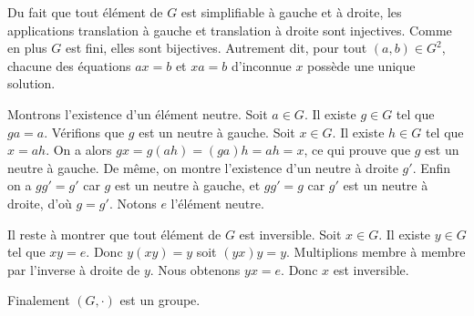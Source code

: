 Du fait que tout élément de $G$ est simplifiable à gauche et à droite, les
applications translation à gauche et translation à droite sont injectives.
Comme en plus $G$ est fini, elles sont bijectives. Autrement dit, pour tout
$(a,b)\in G^2$, chacune des équations $ax = b$ et $xa = b$ d'inconnue $x$
possède une unique solution.

Montrons l'existence d'un élément neutre. Soit $a\in G$. Il existe $g\in G$ tel
que $ga = a$. Vérifions que $g$ est un neutre à gauche. Soit $x\in G$. Il
existe $h\in G$ tel que $x = ah$. On a alors $gx = g(ah) = (ga)h = ah = x$, ce
qui prouve que $g$ est un neutre à gauche. De même, on montre l'existence
d'un neutre à droite $g'$. Enfin on a $gg' = g'$ car $g$ est un neutre à
gauche, et $gg' = g$ car $g'$ est un neutre à droite, d'où $g = g'$. Notons $e$
l'élément neutre.

Il reste à montrer que tout élément de $G$ est inversible. Soit $x\in G$. Il
existe $y\in G$ tel que $xy = e$.  Donc $y(xy) = y$ soit $(yx)y = y$.
Multiplions membre à membre par l'inverse à droite de $y$. Nous obtenons $yx =
e$. Donc $x$ est inversible.

Finalement $(G,\cdot)$ est un groupe.
